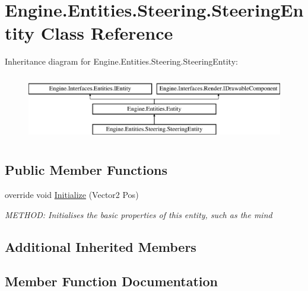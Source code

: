 \hypertarget{a00342}{}\section{Engine.\+Entities.\+Steering.\+Steering\+Entity Class Reference}
\label{a00342}
Inheritance diagram for Engine.\+Entities.\+Steering.\+Steering\+Entity\+:\begin{figure}[H]
\begin{center}
\leavevmode
\includegraphics[height=2.916667cm]{d2/d45/a00342}
\end{center}
\end{figure}
\subsection*{Public Member Functions}
\begin{DoxyCompactItemize}
\item 
override void \hyperlink{a00342_a7b1e3df5320c999d2cf1cc3b97994401}{Initialize} (Vector2 Pos)
\begin{DoxyCompactList}\small\item\em M\+E\+T\+H\+OD\+: Initialises the basic properties of this entity, such as the mind \end{DoxyCompactList}\end{DoxyCompactItemize}
\subsection*{Additional Inherited Members}


\subsection{Member Function Documentation}
\mbox{\label{a00342_a7b1e3df5320c999d2cf1cc3b97994401}} 
